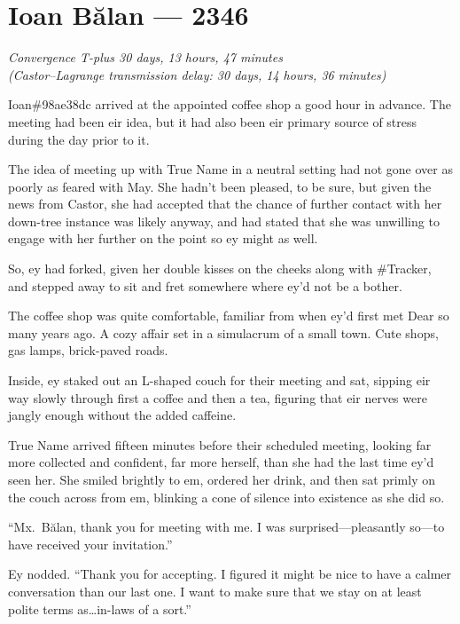 \hypertarget{ioan-bux103lan-2346}{%
\chapter{Ioan Bălan — 2346}}

\begin{center}
\emph{Convergence T-plus 30 days, 13 hours, 47 minutes}\\
\emph{(Castor--Lagrange transmission delay: 30 days, 14 hours, 36 minutes)}
\end{center}

\noindent Ioan\#98ae38dc arrived at the appointed coffee shop a good hour in advance. The meeting had been eir idea, but it had also been eir primary source of stress during the day prior to it.

The idea of meeting up with True Name in a neutral setting had not gone over as poorly as feared with May. She hadn't been pleased, to be sure, but given the news from Castor, she had accepted that the chance of further contact with her down-tree instance was likely anyway, and had stated that she was unwilling to engage with her further on the point so ey might as well.

So, ey had forked, given her double kisses on the cheeks along with \#Tracker, and stepped away to sit and fret somewhere where ey'd not be a bother.

The coffee shop was quite comfortable, familiar from when ey'd first met Dear so many years ago. A cozy affair set in a simulacrum of a small town. Cute shops, gas lamps, brick-paved roads.

Inside, ey staked out an L-shaped couch for their meeting and sat, sipping eir way slowly through first a coffee and then a tea, figuring that eir nerves were jangly enough without the added caffeine.

True Name arrived fifteen minutes before their scheduled meeting, looking far more collected and confident, far more herself, than she had the last time ey'd seen her. She smiled brightly to em, ordered her drink, and then sat primly on the couch across from em, blinking a cone of silence into existence as she did so.

``Mx.~Bălan, thank you for meeting with me. I was surprised—pleasantly so—to have received your invitation.''

Ey nodded. ``Thank you for accepting. I figured it might be nice to have a calmer conversation than our last one. I want to make sure that we stay on at least polite terms as\ldots in-laws of a sort.''

